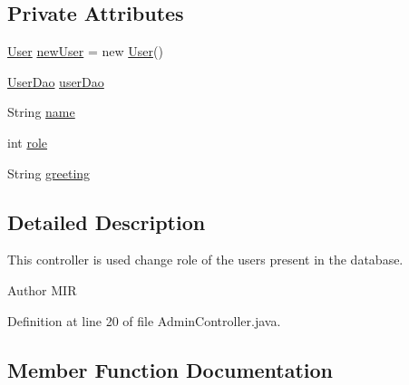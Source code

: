 \subsection*{Private Attributes}
\begin{DoxyCompactItemize}
\item 
\hyperlink{classorg_1_1jboss_1_1as_1_1quickstarts_1_1greeter_1_1domain_1_1_user}{User} \hyperlink{classorg_1_1jboss_1_1as_1_1quickstarts_1_1greeter_1_1web_1_1_admin_controller_a4ea454f048fbaf401d7531988a09838b}{new\+User} = new \hyperlink{classorg_1_1jboss_1_1as_1_1quickstarts_1_1greeter_1_1domain_1_1_user}{User}()
\item 
\hyperlink{interfaceorg_1_1jboss_1_1as_1_1quickstarts_1_1greeter_1_1domain_1_1_user_dao}{User\+Dao} \hyperlink{classorg_1_1jboss_1_1as_1_1quickstarts_1_1greeter_1_1web_1_1_admin_controller_a2acf35dc7505826ddc0e7c5256618248}{user\+Dao}
\item 
String \hyperlink{classorg_1_1jboss_1_1as_1_1quickstarts_1_1greeter_1_1web_1_1_admin_controller_a7ddbb57da6f36a78dcc0e75b45a8a7bc}{name}
\item 
int \hyperlink{classorg_1_1jboss_1_1as_1_1quickstarts_1_1greeter_1_1web_1_1_admin_controller_ad54ca6c54ccdb72464120fa054c40664}{role}
\item 
String \hyperlink{classorg_1_1jboss_1_1as_1_1quickstarts_1_1greeter_1_1web_1_1_admin_controller_af21c260f516d66bf87abed8c522fc070}{greeting}
\end{DoxyCompactItemize}


\subsection{Detailed Description}
This controller is used change role of the users present in the database. 

\begin{DoxyAuthor}{Author}
M\+IR 
\end{DoxyAuthor}


Definition at line 20 of file Admin\+Controller.\+java.



\subsection{Member Function Documentation}
\mbox{\label{classorg_1_1jboss_1_1as_1_1quickstarts_1_1greeter_1_1web_1_1_admin_controller_a0f7cfe80e7838f569ca75a65bc2bba68}} 

